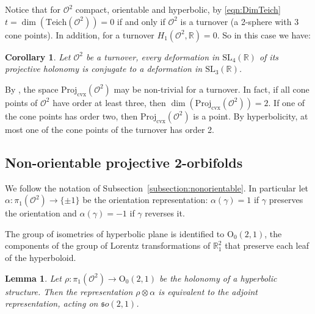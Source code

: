 \documentclass[a4paper,11pt]{article}
\newtheorem{Lemma}[Theorem]{Lemma}
\newtheorem{Corollary}[Theorem]{Corollary}
\begin{document}
Notice that for  $\mathcal O^2$ compact, orientable and hyperbolic,
by \eqref{eqn:DimTeich}
$t=\dim  (\mathrm{Teich}(\mathcal O^2))=0$ if and only if
$\mathcal O^2$ is a turnover (a 2-sphere with 3 cone points). 
In addition, for a turnover $H_1(\mathcal O^2,\mathbb R)=0$.
So in this case we have:


\begin{Corollary}
\label{Corollary:turnover}
  Let  $\mathcal O^2$ be a turnover, every deformation in 
  $\mathrm{SL}_4(\mathbb R)$ of its projective holonomy is
  conjugate to a deformation in  $\mathrm{SL}_3(\mathbb R)$. 
\end{Corollary}

By \cite{ChoiGoldman}, the space  $\mathrm{Proj}_{\mathrm{cvx}}(\mathcal O^2)$ may be 
non-trivial for a turnover. In fact, if all cone points of $\mathcal O^2$ have order at least three, then 
$\dim (\mathrm{Proj}_{\mathrm{cvx}}(\mathcal O^2))=2$.
If one of the cone points has order two, then $ \mathrm{Proj}_{\mathrm{cvx}}(\mathcal O^2)$
is a point. By hyperbolicity, at most one of the cone points of the turnover
has order 2.

\subsection{Non-orientable projective 2-orbifolds}

We follow the notation of Subsection~\ref{subsection:nonorientable}. In particular
 let $\alpha\colon\pi_1(\mathcal O^2)\to \{\pm 1\}$
 be the orientation representation: $\alpha(\gamma)=1$ 
 if $\gamma$ preserves the orientation and $\alpha(\gamma)=-1$ if $\gamma$ reverses it.
 
 
 The group of isometries of hyperbolic plane is identified to $\mathrm{O}_0(2,1)$, the components of
 the group of Lorentz transformations of $\mathbb R^2_1$
 that preserve  each leaf of the hyperboloid. 
  
 
 
 \begin{Lemma}
 \label{lemma:equiv}
  Let $\rho\colon \pi_1(\mathcal O^2)\to 
  \mathrm{O}_0(2,1)$ be the holonomy of a  hyperbolic 
  structure. 
  Then the representation
 $\rho\otimes \alpha$ is equivalent to the adjoint representation, acting on $\mathfrak so(2,1)$.
 \end{Lemma}
\end{document}
